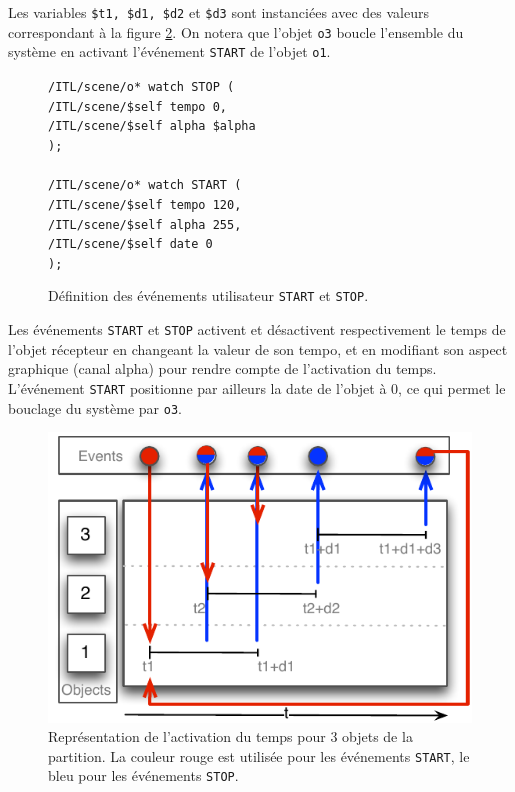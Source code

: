 \documentclass{article}
\newcommand{\OSC}[1]	{{\fontsize{9pt}{9pt} \selectfont\texttt{#1}}}
\newcommand{\sample}[1]		{\vspace{-0.2em}\begin{center}\colorbox{mygrey}{\begin{minipage}[t]{0.98\columnwidth} {\small \texttt{#1}}\end{minipage}}\end{center}}
\begin{document}
Les variables \OSC{\$t1, \$d1, \$d2} et \OSC{\$d3} sont instanciées avec des valeurs correspondant à la figure \ref{fig:sample}. On notera que l'objet \OSC{o3} boucle l'ensemble du système en activant l'événement \OSC{START} de l'objet \OSC{o1}.

\begin{figure}[h]
   \centering
\sample{/ITL/scene/o* watch STOP ( \\
   \hspace*{4mm}/ITL/scene/\$self tempo 0,\\
   \hspace*{4mm}/ITL/scene/\$self alpha \$alpha	\\
);\\
\\
/ITL/scene/o* watch START ( \\
   \hspace*{4mm}/ITL/scene/\$self tempo 120,\\
   \hspace*{4mm}/ITL/scene/\$self alpha 255,\\
   \hspace*{4mm}/ITL/scene/\$self date 0\\
);
}
   \caption{Définition des événements utilisateur \OSC{START} et \OSC{STOP}.}
   \label{fig:ex2}
\end{figure}


Les événements \OSC{START} et \OSC{STOP} activent et désactivent respectivement le temps de l'objet récepteur en changeant la valeur de son tempo, et en modifiant son aspect graphique (canal alpha) pour rendre compte de l'activation du temps. L'événement \OSC{START} positionne par ailleurs la date de l'objet à 0, ce qui permet le bouclage du système par \OSC{o3}.
\begin{figure}[h]
   \centering
   \includegraphics[width=0.8\columnwidth]{imgs/sample}
   \caption{Représentation de l'activation du temps pour 3 objets de la partition. La couleur rouge est utilisée pour les événements \OSC{START}, le bleu pour les événements \OSC{STOP}.}
   \label{fig:sample}
\end{figure}
\end{document}
